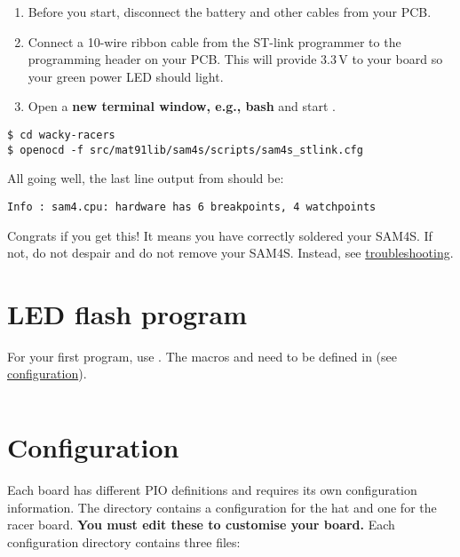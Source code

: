 \begin{enumerate}
\item
  Before you start, disconnect the battery and other cables from your
  PCB.
\item
  Connect a 10-wire ribbon cable from the ST-link programmer to the
  programming header on your PCB. This will provide 3.3\,V to your
  board so your green power LED should light.
\item
  Open a \textbf{new terminal window, e.g., bash} and
  start .
\end{enumerate}

\begin{verbatim}
$ cd wacky-racers
$ openocd -f src/mat91lib/sam4s/scripts/sam4s_stlink.cfg
\end{verbatim}

All going well, the last line output from  should be:

\begin{verbatim}
Info : sam4.cpu: hardware has 6 breakpoints, 4 watchpoints
\end{verbatim}

Congrats if you get this! It means you have correctly soldered your
SAM4S. If not, do not despair and do not remove your SAM4S. Instead,
see \protect\hyperref[troubleshooting]{troubleshooting}.


\section{LED flash program}
\label{led-flash-program}

For your first program, use
. The macros 
and  need to be defined in  (see
\protect\hyperref[configuration]{configuration}).

\inputminted{C}{../../src/test-apps/ledflash1/ledflash1.c}


\section{Configuration}
\label{configuration}

Each board has different PIO definitions and requires its own
configuration information. The  directory contains a
configuration for the hat and one for the racer board.  \textbf{You
must edit these to customise your board.}  Each configuration
directory contains three files:

